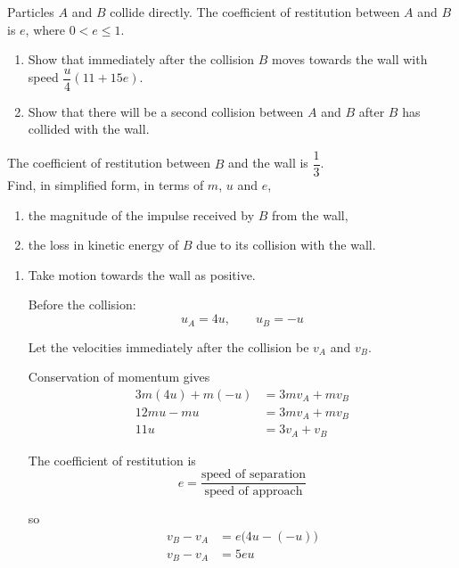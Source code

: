 \documentclass[leqno]{article}
\begin{document}
\begin{enumerate}[
  label=\textbf{\arabic*.},
  leftmargin=*,
  topsep=0pt,
  partopsep=0pt,
  parsep=0pt
]
Particles $A$ and $B$ collide directly. The coefficient of restitution between $A$ and $B$ is $e$, where $0<e\le 1$. \\
\begin{enumerate}[label=\textbf{(\alph*)}]
  \item Show that immediately after the collision $B$ moves towards the wall with speed $\dfrac{u}{4}(11+15e)$.  \\
  \item Show that there will be a second collision between $A$ and $B$ after $B$ has collided with the wall.  \\
\end{enumerate}
The coefficient of restitution between $B$ and the wall is
\(
\dfrac{1}{3}
\). \\

Find, in simplified form, in terms of $m$, $u$ and $e$, \\
\begin{enumerate}[label=\textbf{(\alph*)}, resume]
  \item the magnitude of the impulse received by $B$ from the wall,  \\
  \item the loss in kinetic energy of $B$ due to its collision with the wall.  \\
\end{enumerate}

\vspace*{10pt}

\begin{djsSolution}
\begin{enumerate}[label=\textbf{(\alph*)}]
  \item Take motion towards the wall as positive.

  Before the collision:
  \[
  u_A=4u,\qquad u_B=-u
  \]

  Let the velocities immediately after the collision be $v_A$ and $v_B$.

  Conservation of momentum gives
  \begin{align*}
  3m(4u)+m(-u)&=3mv_A+mv_B\\
  12mu-mu&=3mv_A+mv_B\\
  11u&=3v_A+v_B
  \end{align*}

  The coefficient of restitution is
  \[
  e=\frac{\text{speed of separation}}{\text{speed of approach}}
  \]

  so
  \begin{align*}
  v_B-v_A&=e\bigl(4u-(-u)\bigr)\\
  v_B-v_A&=5eu
  \end{align*}


\end{enumerate}
\end{djsSolution}
\end{enumerate}
\end{document}
